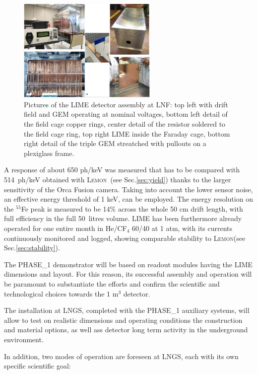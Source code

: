 \documentclass[physics,article,submit,moreauthors,pdftex]{Definitions/mdpi}
\newcommand{\lemon}{{\textsc{Lemon}}\xspace}
\begin{document}
\begin{figure}[!t]
\centering
 \includegraphics[width=0.6\textwidth]{LIME_pic.jpeg}
 \caption{Pictures of the LIME detector assembly at LNF: top left with drift field and GEM operating at nominal voltages, bottom left detail of the field cage copper rings, center detail of the resistor soldered to the field cage ring, top right LIME inside the Faraday cage, bottom right detail of the triple GEM streatched with pullouts on a plexiglass frame.}
 \label{fig:LIME_pic}
 \end{figure}


A response of about 650 ph/keV was measured that has to be compared with 514~ph/keV obtained with \lemon\ (see Sec.\ref{sec:yield}) thanks to the larger sensitivity of the Orca Fusion camera. Taking into account the lower sensor noise, an effective energy threshold of 1 keV, can be employed. The energy resolution on the $^{55}$Fe peak is measured to be 14$\%$ across the whole 50 cm drift length, with full efficiency in the full 50~litres volume. LIME has been furthermore already operated for one entire month in He/CF$_4$ 60/40 at 1 atm, with its currents continuously monitored and logged, showing comparable stability to \lemon (see Sec.\ref{sec:stability}).

The PHASE\_1 demonstrator will be based on readout modules having the LIME dimensions and layout. For this reason, its successful assembly and operation will be paramount to substantiate the efforts and confirm the scientific and technological choices towards the 1 m$^3$ detector. 

The installation at LNGS, completed with the PHASE\_1 auxiliary systems, will allow to test on realistic dimensions and operating conditions the construction and material options, as well ass detector long term activity in the underground environment. 

In addition, two modes of operation  are foreseen at LNGS, each with its own specific scientific goal:
\end{document}
